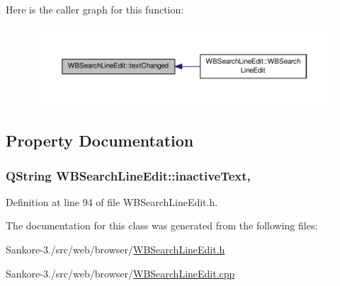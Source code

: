 Here is the caller graph for this function\-:
\nopagebreak
\begin{figure}[H]
\begin{center}
\leavevmode
\includegraphics[width=350pt]{dd/d7f/class_w_b_search_line_edit_a665cc68b5a39c70d0f371e8f6d8887ff_icgraph}
\end{center}
\end{figure}




\subsection{Property Documentation}
\hypertarget{class_w_b_search_line_edit_a50a8748d17d08f45fbf6fb43b3c5f56d}{
\subsubsection[{inactive\-Text}]{\setlength{\rightskip}{0pt plus 5cm}Q\-String W\-B\-Search\-Line\-Edit\-::inactive\-Text\hspace{0.3cm}{\ttfamily [read]}, {\ttfamily [write]}}}\label{dd/d7f/class_w_b_search_line_edit_a50a8748d17d08f45fbf6fb43b3c5f56d}


Definition at line 94 of file W\-B\-Search\-Line\-Edit.\-h.



The documentation for this class was generated from the following files\-:\begin{DoxyCompactItemize}
\item 
Sankore-\/3./src/web/browser/\hyperlink{_w_b_search_line_edit_8h}{W\-B\-Search\-Line\-Edit.\-h}\item 
Sankore-\/3./src/web/browser/\hyperlink{_w_b_search_line_edit_8cpp}{W\-B\-Search\-Line\-Edit.\-cpp}\end{DoxyCompactItemize}

